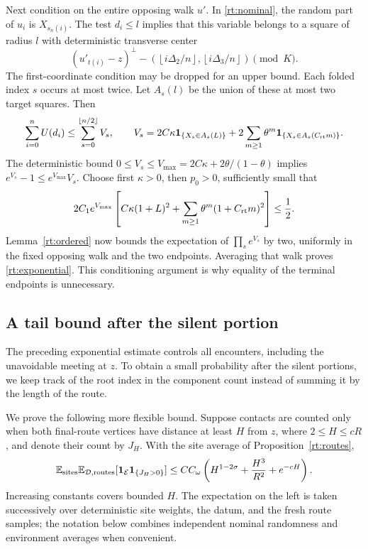 Next condition on the entire opposing walk \(u'\).  In
\eqref{rt:nominal}, the random part of \(u_i\) is \(X_{s_n(i)}\).
The test \(d_i\le l\) implies that this variable belongs to a square
of radius \(l\) with deterministic transverse center
\[
 (u'_{t(i)}-z)^\perp
       -\left(\left\lfloor i\Delta_2/n\right\rfloor,
               \left\lfloor i\Delta_3/n\right\rfloor\right)
       \pmod K.
\]
The first-coordinate condition may be dropped for an upper bound.
Each folded index \(s\) occurs at most twice.  Let \(A_s(l)\) be
the union of these at most two target squares.  Then
\[
 \sum_{i=0}^n U(d_i)
 \le \sum_{s=0}^{\lfloor n/2\rfloor}V_s,\qquad
 V_s=2C\kappa\mathbf1_{\{X_s\in A_s(L)\}}
          +2\sum_{m\ge1}\theta^m
                    \mathbf1_{\{X_s\in A_s(C_{\rm rt}m)\}}.
\]
The deterministic bound
\(0\le V_s\le V_{\max}=2C\kappa+2\theta/(1-\theta)\)
implies \(e^{V_s}-1\le e^{V_{\max}}V_s\).  Choose first
\(\kappa>0\), then \(p_0>0\), sufficiently small that
\[
 2C_1e^{V_{\max}}\left[
 C\kappa(1+L)^2+\sum_{m\ge1}\theta^m(1+C_{\rm rt}m)^2\right]\le\frac12.
\]
Lemma~\ref{rt:ordered} now bounds the expectation of
\(\prod_s e^{V_s}\) by two, uniformly in the fixed opposing walk
and the two endpoints.  Averaging that walk proves
\eqref{rt:exponential}.  This conditioning argument is why equality
of the terminal endpoints is unnecessary.

\subsection{A tail bound after the silent portion}

The preceding exponential estimate controls all encounters, including
the unavoidable meeting at \(z\).  To obtain a small probability after
the silent portions, we keep track of the root index in the component
count instead of summing it by the length of the route.

We prove the following more flexible bound.  Suppose contacts are
counted only when both final-route vertices have distance at least
\(H\) from \(z\), where \(2\le H\le cR\), and denote their count
by \(J_H\).  With the site average of Proposition~\ref{rt:routes},
\begin{equation}\label{rt:general-tail}
 \mathbb E_{\rm sites}\mathbb E_{\mathcal D,\rm routes}
  [\mathbf1_{\mathcal E}\mathbf1_{\{J_H>0\}}]
 \le CC_\omega\left(H^{1-2\sigma}+\frac{H^3}{R^2}+e^{-cH}\right).
\end{equation}
Increasing constants covers bounded \(H\).  The expectation on the
left is taken successively over deterministic site weights, the datum,
and the fresh route samples; the notation below combines independent
nominal randomness and environment averages when convenient.

